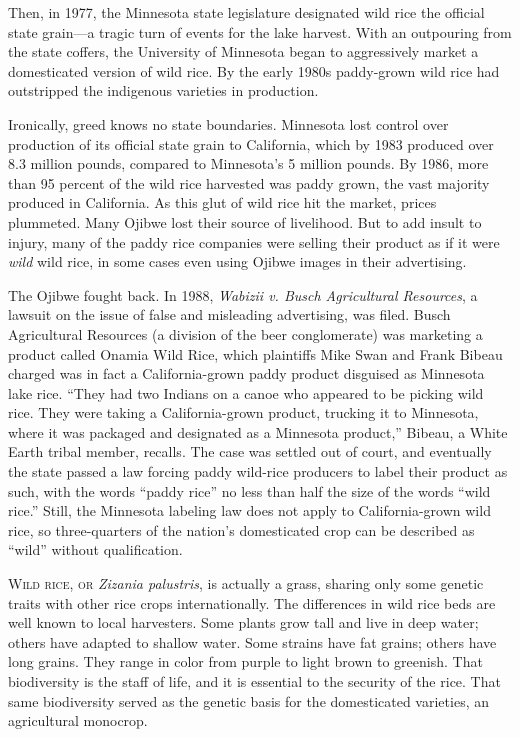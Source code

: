 Then, in 1977, the Minnesota state legislature designated wild rice the
official state grain---a tragic turn of events for the lake harvest.
With an outpouring from the state coffers, the University of Minnesota
began to aggressively market a domesticated version of wild rice. By the
early 1980s paddy-grown wild rice had outstripped the indigenous
varieties in production.

Ironically, greed knows no state boundaries. Minnesota lost control over
production of its official state grain to California, which by 1983
produced over 8.3 million pounds, compared to Minnesota's 5 million
pounds. By 1986, more than 95 percent of the wild rice harvested was
paddy grown, the vast majority produced in California. As this glut of
wild rice hit the market, prices plummeted. Many Ojibwe lost their
source of livelihood. But to add insult to injury, many of the paddy
rice companies were selling their product as if it were \emph{wild} wild
rice, in some cases even using Ojibwe images in their advertising.

The Ojibwe fought back. In 1988, \emph{Wabizii v. Busch Agricultural
Resources}, a lawsuit on the issue of false and misleading advertising,
was filed. Busch Agricultural Resources (a division of the beer
conglomerate) was marketing a product called Onamia Wild Rice, which
plaintiffs Mike Swan and Frank Bibeau charged was in fact a
California-grown paddy product disguised as Minnesota lake rice. ``They
had two Indians on a canoe who appeared to be picking wild rice. They
were taking a California-grown product, trucking it to Minnesota, where
it was packaged and designated as a Minnesota product,'' Bibeau, a White
Earth tribal member, recalls. The case was settled out of court, and
eventually the state passed a law forcing paddy wild-rice producers to
label their product as such, with the words ``paddy rice'' no less than
half the size of the words ``wild rice.'' Still, the Minnesota labeling
law does not apply to California-grown wild rice, so three-quarters of
the nation's domesticated crop can be described as ``wild'' without
qualification.

\textsc{Wild rice, or} \emph{Zizania palustris}, is actually a grass,
sharing only some genetic traits with other rice crops internationally.
The differences in wild rice beds are well known to local harvesters.
Some plants grow tall and live in deep water; others have adapted to
shallow water. Some strains have fat grains; others have long grains.
They range in color from purple to light brown to greenish. That
biodiversity is the staff of life, and it is essential to the security
of the rice. That same biodiversity served as the genetic basis for the
domesticated varieties, an agricultural monocrop.

